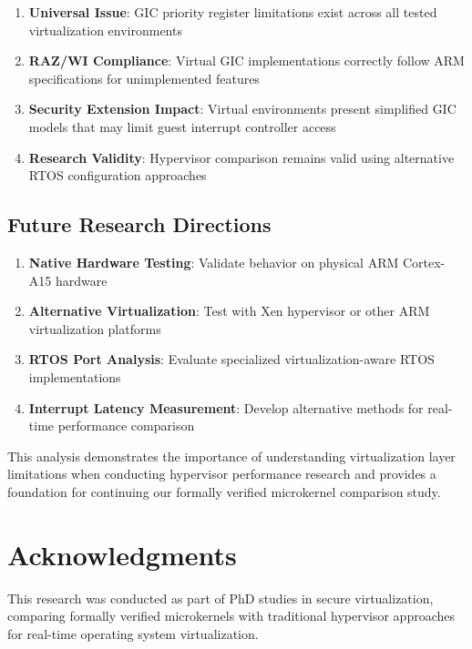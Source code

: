 \documentclass[12pt,a4paper]{article}
\begin{document}
\begin{enumerate}
    \item \textbf{Universal Issue}: GIC priority register limitations exist across all tested virtualization environments
    \item \textbf{RAZ/WI Compliance}: Virtual GIC implementations correctly follow ARM specifications for unimplemented features
    \item \textbf{Security Extension Impact}: Virtual environments present simplified GIC models that may limit guest interrupt controller access
    \item \textbf{Research Validity}: Hypervisor comparison remains valid using alternative RTOS configuration approaches
\end{enumerate}

\subsection{Future Research Directions}

\begin{enumerate}
    \item \textbf{Native Hardware Testing}: Validate behavior on physical ARM Cortex-A15 hardware
    \item \textbf{Alternative Virtualization}: Test with Xen hypervisor or other ARM virtualization platforms  
    \item \textbf{RTOS Port Analysis}: Evaluate specialized virtualization-aware RTOS implementations
    \item \textbf{Interrupt Latency Measurement}: Develop alternative methods for real-time performance comparison
\end{enumerate}

This analysis demonstrates the importance of understanding virtualization layer limitations when conducting hypervisor performance research and provides a foundation for continuing our formally verified microkernel comparison study.

\section*{Acknowledgments}

This research was conducted as part of PhD studies in secure virtualization, comparing formally verified microkernels with traditional hypervisor approaches for real-time operating system virtualization.
\end{document}
